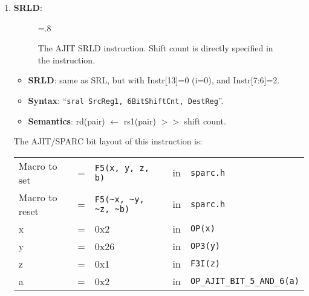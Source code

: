 \begin{enumerate}
\begin{enumerate}
  \item \textbf{SRLD}:\\
    \begin{center}
      \begin{figure}[h]
        \centering
        \epsfxsize=.8\linewidth
        \caption{The AJIT  SRLD instruction.  Shift count  is directly
          specified in the instruction.}
        \label{fig:ajit:srld:insn}
      \end{figure}
    \end{center}
    \begin{itemize}
    \item []\textbf{SRLD}: same as SRL, but with Instr[13]=0 (i=0),
      and Instr[7:6]=2.
    \item []\textbf{Syntax}: ``\texttt{sral SrcReg1, 6BitShiftCnt,
        DestReg}''. \\
    \item []\textbf{Semantics}: rd(pair) $\leftarrow$ rs1(pair) $>>$
      shift count.
    \end{itemize}

    The AJIT/SPARC bit layout of this instruction is:

    \begin{tabular}[h]{lclcl}
      Macro to set   &=&  \verb|F5(x, y, z, b)|     &in& \verb|sparc.h|  \\
      Macro to reset &=&  \verb|F5(~x, ~y, ~z, ~b)| &in& \verb|sparc.h|  \\
      x              &=& 0x2                        &in& \verb|OP(x)|    \\
      y              &=& 0x26                       &in& \verb|OP3(y)|   \\
      z              &=& 0x1                        &in& \verb|F3I(z)|   \\
      a              &=& 0x2                        &in& \verb|OP_AJIT_BIT_5_AND_6(a)|
    \end{tabular}


\end{enumerate}
\end{enumerate}
